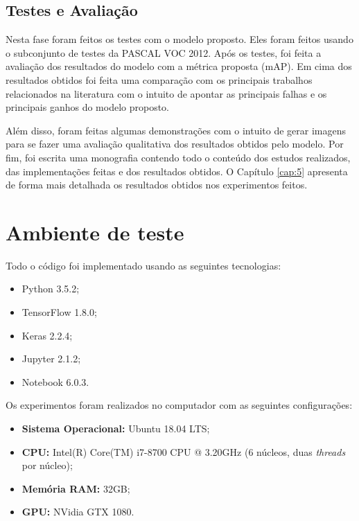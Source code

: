 \subsection{Testes e Avaliação}
\label{sec:4:1:3}

Nesta fase foram feitos os testes com o modelo proposto. Eles foram feitos usando o subconjunto de testes da \ac{PASCAL VOC} 2012. Após os testes, foi feita a avaliação dos resultados do modelo com a métrica proposta (\ac{mAP}). Em cima dos resultados obtidos foi feita uma comparação com os principais trabalhos relacionados na literatura \cite{wei-2015, cheng-2017} com o intuito de apontar as principais falhas e os principais ganhos do modelo proposto.

Além disso, foram feitas algumas demonstrações com o intuito de gerar imagens para se fazer uma avaliação qualitativa dos resultados obtidos pelo modelo. Por fim, foi escrita uma monografia contendo todo o conteúdo dos estudos realizados, das implementações feitas e dos resultados obtidos. O Capítulo \ref{cap:5} apresenta de forma mais detalhada os resultados obtidos nos experimentos feitos.

\section{Ambiente de teste}
\label{sec:4:2}

Todo o código foi implementado usando as seguintes tecnologias:

\begin{itemize}
	\item Python 3.5.2;
	\item TensorFlow 1.8.0;
	\item Keras 2.2.4;
	\item Jupyter 2.1.2;
	\item Notebook 6.0.3.
\end{itemize}

Os experimentos foram realizados no computador com as seguintes configurações:

\begin{itemize}
	\item \textbf{Sistema Operacional:} Ubuntu 18.04 LTS;
	\item \textbf{CPU:} Intel(R) Core(TM) i7-8700 CPU @ 3.20GHz (6 núcleos, duas \textit{threads} por núcleo);
	\item \textbf{Memória RAM:} 32GB;
	\item \textbf{GPU:} NVidia GTX 1080.
\end{itemize}


